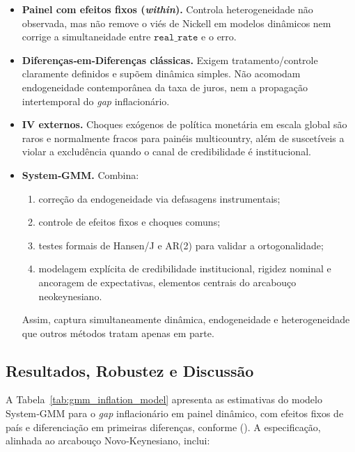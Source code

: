\documentclass[a4paper,12pt]{article}[abnt2]
\begin{document}
\begin{itemize}
  \item \textbf{Painel com efeitos fixos (\textit{within}).}  
        Controla heterogeneidade não observada, mas não remove o viés de Nickell
        em modelos dinâmicos nem corrige a simultaneidade entre
        \(\texttt{real\_rate}\) e o erro.

  \item \textbf{Diferenças‑em‑Diferenças clássicas.}  
        Exigem tratamento/controle claramente definidos e supõem dinâmica
        simples. Não acomodam endogeneidade contemporânea da taxa de juros,
        nem a propagação intertemporal do \textit{gap} inflacionário.

  \item \textbf{IV externos.}  
        Choques exógenos de política monetária em escala global são raros e
        normalmente fracos para painéis multicountry, além de suscetíveis a
        violar a excludência quando o canal de credibilidade é institucional.

  \item \textbf{System‑GMM.}  
        Combina:  
        \begin{enumerate}
          \item correção da endogeneidade via defasagens instrumentais;  
          \item controle de efeitos fixos e choques comuns;  
          \item testes formais de Hansen/J e AR(2) para validar a ortogonalidade;  
          \item modelagem explícita de credibilidade institucional,
                rigidez nominal e ancoragem de expectativas, elementos centrais
                do arcabouço neokeynesiano.  
        \end{enumerate}
        Assim, captura simultaneamente dinâmica, endogeneidade e heterogeneidade
        que outros métodos tratam apenas em parte.
\end{itemize}


\subsection{\textbf{Resultados, Robustez e Discussão}}

A Tabela~\ref{tab:gmm_inflation_model} apresenta as estimativas do modelo
System‑GMM para o \textit{gap} inflacionário em painel dinâmico, com efeitos
fixos de país e diferenciação em primeiras diferenças, conforme
\citeauthor{CameronTrivedi2005} (\citeyear{CameronTrivedi2005}).  
A especificação, alinhada ao arcabouço Novo‑Keynesiano, inclui:  
\end{document}
